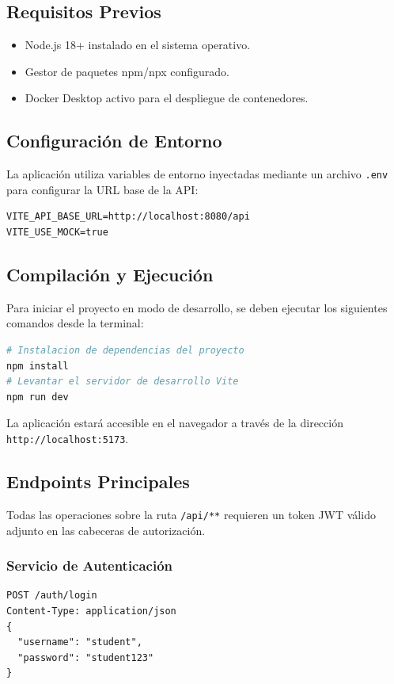 \documentclass[12pt,a4paper]{article}
\begin{document}
\subsection{Requisitos Previos}
\begin{itemize}
    \item Node.js 18+ instalado en el sistema operativo.
    \item Gestor de paquetes npm/npx configurado.
    \item Docker Desktop activo para el despliegue de contenedores.
\end{itemize}

\subsection{Configuración de Entorno}
La aplicación utiliza variables de entorno inyectadas mediante un archivo \texttt{.env} para configurar la URL base de la API:
\begin{lstlisting}
VITE_API_BASE_URL=http://localhost:8080/api
VITE_USE_MOCK=true
\end{lstlisting}

\subsection{Compilación y Ejecución}
Para iniciar el proyecto en modo de desarrollo, se deben ejecutar los siguientes comandos desde la terminal:
\begin{lstlisting}[language=bash]
# Instalacion de dependencias del proyecto
npm install
# Levantar el servidor de desarrollo Vite
npm run dev
\end{lstlisting}

La aplicación estará accesible en el navegador a través de la dirección \texttt{http://localhost:5173}.

\subsection{Endpoints Principales}
Todas las operaciones sobre la ruta \texttt{/api/**} requieren un token JWT válido adjunto en las cabeceras de autorización.

\subsubsection{Servicio de Autenticación}
\begin{lstlisting}[basicstyle=\ttfamily\scriptsize]
POST /auth/login
Content-Type: application/json
{
  "username": "student",
  "password": "student123"
}
\end{lstlisting}
\end{document}

